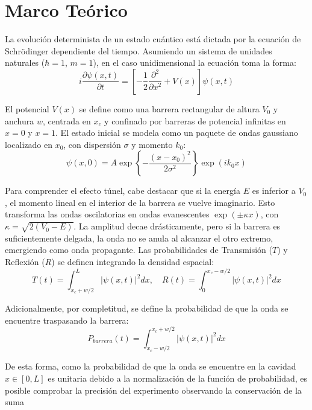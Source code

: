 \section{Marco Teórico}

La evolución determinista de un estado cuántico está dictada por la ecuación de Schrödinger dependiente del tiempo. Asumiendo un sistema de unidades naturales ($\hbar = 1$, $m = 1$), en el caso unidimensional la ecuación toma la forma:
\begin{equation}
    i \frac{\partial \psi(x,t)}{\partial t} = \left[ -\frac{1}{2} \frac{\partial^2}{\partial x^2} + V(x) \right] \psi(x,t)
\end{equation}

El potencial $V(x)$ se define como una barrera rectangular de altura $V_0$ y anchura $w$, centrada en $x_c$ y confinado por barreras de potencial infinitas en $x=0$ y $x=1$. El estado inicial se modela como un paquete de ondas gaussiano localizado en $x_0$, con dispersión $\sigma$ y momento $k_0$:
\begin{equation}
    \psi(x,0) = A \exp\left\{-\frac{(x - x_0)^2}{2\sigma^2}\right\} \exp(i k_0 x)
\end{equation}

Para comprender el efecto túnel, cabe destacar que si la energía $E$ es inferior a $V_0$, el momento lineal en el interior de la barrera se vuelve imaginario. Esto transforma las ondas oscilatorias en ondas evanescentes $\exp(\pm \kappa x)$, con $\kappa = \sqrt{2(V_0 - E)}$. La amplitud decae drásticamente, pero si la barrera es suficientemente delgada, la onda no se anula al alcanzar el otro extremo, emergiendo como onda propagante. Las probabilidades de Transmisión ($T$) y Reflexión ($R$) se definen integrando la densidad espacial:
\begin{equation}
    T(t) = \int_{x_c + w/2}^{L} |\psi(x,t)|^2 dx, \quad R(t) = \int_{0}^{x_c - w/2} |\psi(x,t)|^2 dx
\end{equation}

Adicionalmente, por completitud, se define la probabilidad de que la onda se encuentre traspasando la barrera:
\begin{equation}
    P_{barrera}(t) = \int_{x_c - w/2}^{x_c + w/2} |\psi(x,t)|^2 dx
\end{equation}

De esta forma, como la probabilidad de que la onda se encuentre en la cavidad $x\in [0,L]$ es unitaria debido a la normalización de la función de probabilidad, es posible comprobar la precisión del experimento observando la conservación de la suma

